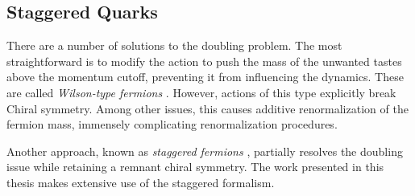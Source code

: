 
    \subsection{Staggered Quarks}
    \label{sec:staggeredquarks}

    There are a number of solutions to the doubling problem. The most straightforward is to modify the action to push the mass of the unwanted tastes above the momentum cutoff, preventing it from influencing the dynamics. These are called \textit{Wilson-type fermions} \cite{Wilson:1974sk}. However, actions of this type explicitly break Chiral symmetry. Among other issues, this causes additive renormalization of the fermion mass, immensely complicating renormalization procedures.

    Another approach, known as \textit{staggered fermions} \cite{Kogut:1974ag}, partially resolves the doubling issue while retaining a remnant chiral symmetry. The work presented in this thesis makes extensive use of the staggered formalism.

